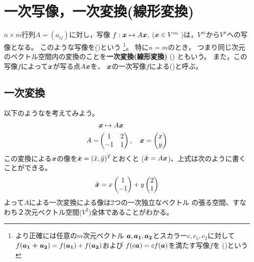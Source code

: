 \documentclass[twocolumn,11pt]{jarticle}
\begin{document}
\section{一次写像，一次変換(線形変換)\label{sec:linear-trans}}
$n\times m$行列$A=(a_{ij})$に対し，写像
$f:\boldsymbol{x}\mapsto A\boldsymbol{x}$, 
($\boldsymbol{x} \in V^m$
)は，$V^m$から$V^n$への写像となる。
このような写像を()という
\footnote{より正確には任意の$m$次元ベクトル
  $\boldsymbol{a},\boldsymbol{a_1},\boldsymbol{a_2}$とスカラー$c,c_1,c_2$に対して
  $f(\boldsymbol{a_1+a_2})=f(\boldsymbol{a_1})+f(\boldsymbol{a_2})$および
  $f(c\boldsymbol{a})=cf(\boldsymbol{a})$を満たす写像$f$を
  ()という}。 
特に$n=m$のとき，
つまり同じ次元のベクトル空間内の変換のことを\textbf{一次変換(線形変換)}
()
ともいう。
また，この写像$f$によって$\boldsymbol{x}$が写る点$A\boldsymbol{x}$を、
$\boldsymbol{x}$の一次写像$f$による()と呼ぶ。
% 

\subsection{一次変換}
以下のようなを考えてみよう。
\begin{align}
  &\boldsymbol{x}\mapsto A\boldsymbol{x}\notag\\
  A=&
  \begin{pmatrix}
    1 & 2 \\
    -1 & 1
  \end{pmatrix},\quad
  \boldsymbol{x}=
  \begin{pmatrix}
    x \\ y
  \end{pmatrix}\notag
\end{align}
この変換による$\boldsymbol{x}$の像を$\tilde{\boldsymbol{x}}=(\tilde{x}, \tilde{y})^T$とおくと
($\tilde{\boldsymbol{x}}=A\boldsymbol{x}$)、上式は次のように書くことができる。
\begin{align}
  \tilde{\boldsymbol{x}}=x
  \begin{pmatrix}
    1 \\ -1
  \end{pmatrix}
  +y
  \begin{pmatrix}
    2 \\ 1
  \end{pmatrix}
\end{align}
よって$A$による一次変換による像は2つの一次独立なベクトル
の張る空間、すなわち２次元ベクトル空間($V^2$)全体であることがわかる。
\end{document}
